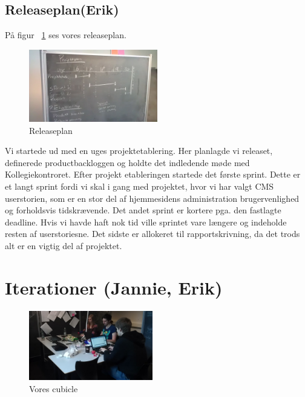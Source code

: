 \documentclass[12pt, a4paper]{report}
\begin{document}
\subsection{Releaseplan(Erik)}
På figur ~\ref{release_plan} ses vores releaseplan.
\begin{figure}[ht]
\centering
\includegraphics[width=0.5\textwidth]{releaseplan}
\caption{Releaseplan}
\label{release_plan}
\end{figure}

Vi startede ud med en uges projektetablering. Her planlagde vi releaset, definerede productbackloggen og holdte det indledende møde med Kollegiekontroret.
Efter projekt etableringen startede det første sprint. Dette er et langt sprint fordi vi skal i gang med projektet, hvor vi har valgt CMS userstorien, som er en stor del af hjemmesidens administration brugervenlighed og forholdsvis tidskrævende.
Det andet sprint er kortere pga. den fastlagte deadline. Hvis vi havde haft nok tid ville sprintet vare længere og indeholde resten af userstoriesne.
Det sidste er allokeret til rapportskrivning, da det trods alt er en vigtig del af projektet.

\section{Iterationer (Jannie, Erik)}
\begin{figure}
\vspace{-0.8cm}
\begin{center}
\includegraphics[width=0.48\textwidth]{ziriuzarbejde}
\end{center}
\vspace{-0.8cm}
\caption{Vores cubicle}
\label{cubicle}
\end{figure}
\end{document}
